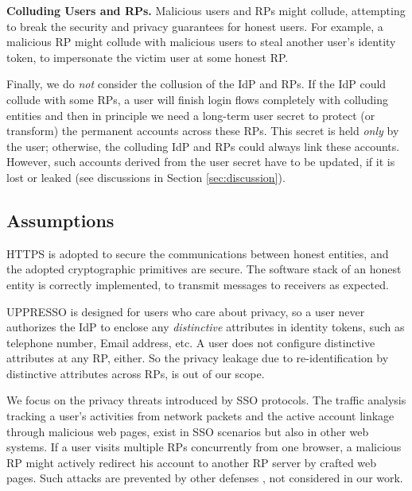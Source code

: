 \noindent \textbf{Colluding Users and RPs.}
Malicious users and RPs might collude,
 attempting to break the security and privacy guarantees for honest users.
For example, a malicious RP might collude with malicious users to steal another user's identity token,
    to impersonate the victim user at some honest RP.

Finally, we do \emph{not} consider the collusion of the IdP and RPs.
    If the IdP could collude with some RPs,
        a user will finish login flows completely with colluding entities
        and then in principle we need a long-term user secret to protect (or transform) the permanent accounts across these RPs.
This secret is held \emph{only} by the user;
    otherwise, the colluding IdP and RPs could always link these accounts.
However, such accounts derived from the user secret have to be updated,
    if it is lost or leaked
    (see discussions in Section \ref{sec:discussion}).

\subsection{Assumptions}
HTTPS is adopted to secure the communications between honest entities,
 and the adopted cryptographic primitives are secure.
The software stack of an honest entity is correctly implemented,
     to transmit messages to receivers as expected.

UPPRESSO is designed for users who care about privacy,
so a user never authorizes the IdP to enclose any \emph{distinctive} attributes in identity tokens,
 such as telephone number, Email address, etc.
A user does not configure  distinctive attributes at any RP, either.
So the privacy leakage due to re-identification by distinctive attributes across RPs,
    is out of our scope.

We focus on the privacy threats introduced by SSO protocols.
The traffic analysis tracking a user's activities from network packets
    and the active account linkage through malicious web pages,
        exist in SSO scenarios but also in other web systems.
If a user visits multiple RPs concurrently from one browser,
        a malicious RP might actively redirect his account to another RP server by crafted web pages.
Such attacks are prevented by other defenses \cite{FedCM},
    not considered in our work.

